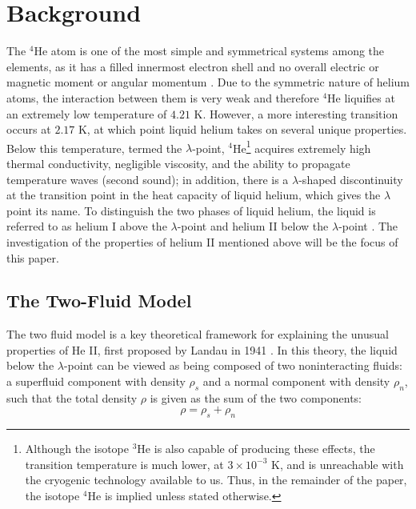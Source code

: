 
\section{Background}\label{background}

The $^4$He atom is one of the most simple and symmetrical systems
among the elements, as it has a filled innermost electron shell and no
overall electric or magnetic moment or angular momentum
\cite{atkins}. Due to the symmetric nature of helium atoms, the
interaction between them is very weak and therefore $^4$He liquifies
at an extremely low temperature of $4.21$ K. However, a more
interesting transition occurs at $2.17$ K, at which point liquid
helium takes on several unique properties. Below this temperature,
termed the $\lambda$-point, $^4$He\footnote{Although the isotope
  $^3$He is also capable of producing these effects, the transition
  temperature is much lower, at $3\times 10^{-3}$ K, and is
  unreachable with the cryogenic technology available to us. Thus, in
  the remainder of the paper, the isotope $^4$He is implied unless
  stated otherwise.}  acquires extremely high thermal conductivity,
negligible viscosity, and the ability to propagate temperature waves
(second sound); in addition, there is a $\lambda$-shaped discontinuity
at the transition point in the heat capacity of liquid helium, which
gives the $\lambda$ point its name. To distinguish the two phases of
liquid helium, the liquid is referred to as helium I above the
$\lambda$-point and helium II below the $\lambda$-point
\cite{tilley}. The investigation of the properties of helium II
mentioned above will be the focus of this paper.

\subsection{The Two-Fluid Model}\label{thetwofluidmodel}

The two fluid model is a key theoretical framework for explaining the
unusual properties of He II, first proposed by Landau in 1941
\cite{landau}. In this theory, the liquid below the $\lambda$-point
can be viewed as being composed of two noninteracting fluids: a
superfluid component with density $\rho_s$ and a normal component with
density $\rho_n$, such that the total density $\rho$ is given as the
sum of the two components:
\begin{equation}
\rho = \rho_s + \rho_n
\label{eqn:density}
\end{equation}

